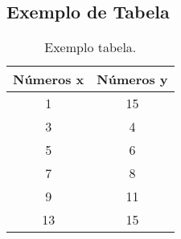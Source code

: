 %
%

\begin{apendicesenv}




\chapter{Exemplo de Tabela}

\begin{table}[H]
    \centering
    \caption[Exemplo tabela]{Exemplo tabela.\label{tab:exetab}}
    \begin{tabular}{|c|c|}
        \hline
            \textbf{Números x} & \textbf{Números y} \\
        \hline
             1 & 15     \\ \hline
             3 & 4      \\ \hline
             5 & 6      \\ \hline
             7 & 8      \\ \hline
			 9 & 11     \\ \hline
             13 & 15    \\
        \hline
    \end{tabular}
\end{table}

\end{apendicesenv}
